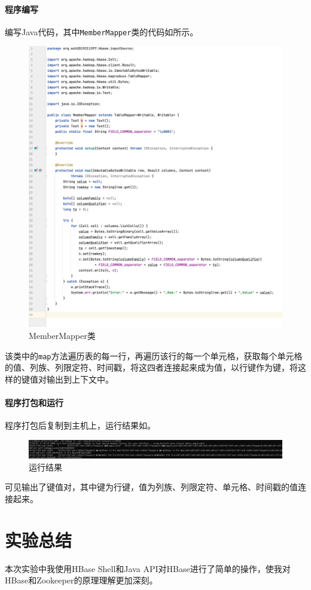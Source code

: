 \documentclass[lang=cn,11pt,a4paper,cite=authornum]{paper}
\begin{document}
\paragraph{程序编写}

编写Java代码，其中\texttt{MemberMapper}类的代码如所示。

\begin{figure}[!htb]
    \centering
    \includegraphics[width=\textwidth]{./images/mapper.jpg}
    \caption{MemberMapper类\label{fig:mapper}}
\end{figure}

该类中的\texttt{map}方法遍历表的每一行，再遍历该行的每一个单元格，获取每个单元格的值、列族、列限定符、时间戳，将这四者连接起来成为值，以行键作为键，将这样的键值对输出到上下文中。

\paragraph{程序打包和运行}

程序打包后复制到主机上，运行结果如。

\begin{figure}[!htb]
    \centering
    \includegraphics[width=\textwidth]{./images/res.jpg}
    \caption{运行结果\label{fig:res}}
\end{figure}

可见输出了键值对，其中键为行键，值为列族、列限定符、单元格、时间戳的值连接起来。

\section{实验总结}

本次实验中我使用HBase Shell和Java API对HBase进行了简单的操作，使我对HBase和Zookeeper的原理理解更加深刻。
\end{document}
